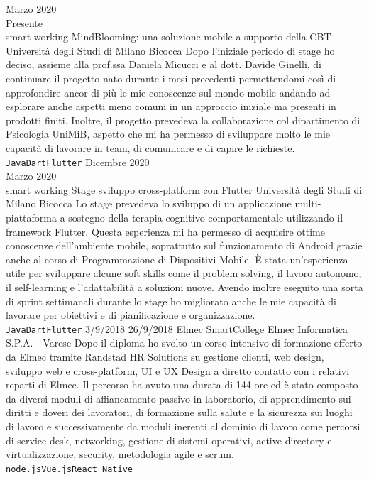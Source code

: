 \documentclass[9pt]{developercv} %
\begin{document}
\begin{entrylist}
	
	\entry
		{Marzo 2020 \\ Presente \\\footnotesize{smart working}}
		{MindBlooming: una soluzione mobile a supporto della CBT}
		{Università degli Studi di Milano Bicocca}
		{Dopo l'iniziale periodo di stage ho deciso, assieme alla prof.ssa Daniela Micucci e al dott. Davide Ginelli, di continuare il progetto nato durante i mesi precedenti permettendomi così di approfondire ancor di più le mie conoscenze sul mondo mobile andando ad esplorare anche aspetti meno comuni in un approccio iniziale ma presenti in prodotti finiti. Inoltre, il progetto prevedeva la collaborazione col dipartimento di Psicologia UniMiB, aspetto che mi ha permesso di sviluppare molto le mie capacità di lavorare in team, di comunicare e di capire le richieste. \\ \texttt{Java}\slashsep\texttt{Dart}\slashsep\texttt{Flutter}}
	\entry
		{Dicembre 2020 \\ Marzo 2020\\\footnotesize{smart working}}
		{Stage sviluppo cross-platform con Flutter}
		{Università degli Studi di Milano Bicocca}
		{Lo stage prevedeva lo sviluppo di un applicazione multi-piattaforma a sostegno della terapia cognitivo comportamentale utilizzando il framework Flutter. Questa esperienza mi ha permesso di acquisire ottime conoscenze dell'ambiente mobile, soprattutto sul funzionamento di Android grazie anche al corso di Programmazione di Dispositivi Mobile. È stata un'esperienza utile per sviluppare alcune soft skills come il problem solving, il lavoro autonomo, il self-learning e l'adattabilità a soluzioni nuove. Avendo inoltre eseguito una sorta di sprint settimanali durante lo stage ho migliorato anche le mie capacità di lavorare per obiettivi e di pianificazione e organizzazione.  \\ \texttt{Java}\slashsep\texttt{Dart}\slashsep\texttt{Flutter}}
	\entry
		{3/9/2018  26/9/2018}
		{Elmec SmartCollege}
		{Elmec Informatica S.P.A. - Varese}
		{Dopo il diploma ho svolto un corso intensivo di formazione offerto da Elmec tramite Randstad HR Solutions su gestione clienti, web design, sviluppo web e cross-platform, UI e UX Design a diretto contatto con i relativi reparti di Elmec. Il percorso ha avuto una durata di 144 ore ed è stato composto da diversi moduli di affiancamento passivo in laboratorio, di apprendimento sui diritti e doveri dei lavoratori, di formazione sulla salute e la sicurezza sui luoghi di lavoro e successivamente da moduli inerenti al dominio di lavoro come percorsi di service desk, networking, gestione di sistemi operativi, active directory e virtualizzazione, security, metodologia agile e scrum.\\ \texttt{node.js}\slashsep\texttt{Vue.js}\slashsep\texttt{React Native}}

\end{entrylist}
\end{document}
